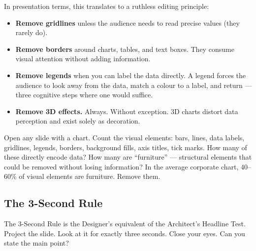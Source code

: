 In presentation terms, this translates to a ruthless editing principle:

\begin{itemize}
  \item \textbf{Remove gridlines} unless the audience needs to read precise values (they rarely do).
  \item \textbf{Remove borders} around charts, tables, and text boxes. They consume visual attention without adding information.
  \item \textbf{Remove legends} when you can label the data directly. A legend forces the audience to look away from the data, match a colour to a label, and return --- three cognitive steps where one would suffice.
  \item \textbf{Remove 3D effects.} Always. Without exception. 3D charts distort data perception and exist solely as decoration.
\end{itemize}

\begin{alertbox}
Open any slide with a chart. Count the visual elements: bars, lines, data labels, gridlines, legends, borders, background fills, axis titles, tick marks. How many of these directly encode data? How many are ``furniture'' --- structural elements that could be removed without losing information? In the average corporate chart, 40--60\% of visual elements are furniture. Remove them.
\end{alertbox}


\subsection{The 3-Second Rule}

The 3-Second Rule is the Designer's equivalent of the Architect's Headline Test. Project the slide. Look at it for exactly three seconds. Close your eyes. Can you state the main point?

